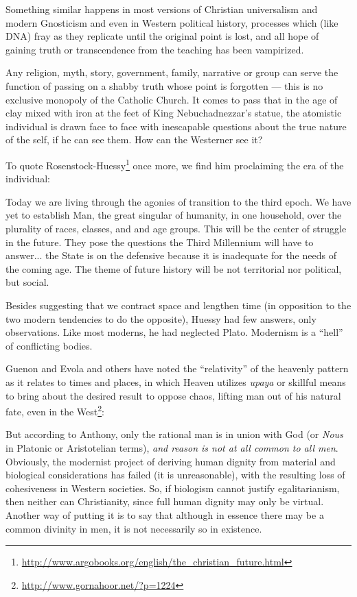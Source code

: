 Something similar happens in most versions of Christian universalism and modern Gnosticism and even in Western political history, processes which (like DNA) fray as they replicate until the original point is lost, and all hope of gaining truth or transcendence from the teaching has been vampirized.

Any religion, myth, story, government, family, narrative or group can serve the function of passing on a shabby truth whose point is forgotten --- this is no exclusive monopoly of the Catholic Church. It comes to pass that in the age of clay mixed with iron at the feet of King Nebuchadnezzar's statue, the atomistic individual is drawn face to face with inescapable questions about the true nature of the self, if he can see them. How can the Westerner see it?

To quote Rosenstock-Huessy\footnote{\url{http://www.argobooks.org/english/the_christian_future.html}} once more, we find him proclaiming the era of the individual:

\begin{quotex}
Today we are living through the agonies of transition to the third epoch. We have yet to establish Man, the great singular of humanity, in one household, over the plurality of races, classes, and and age groups. This will be the center of struggle in the future. They pose the questions the Third Millennium will have to answer... the State is on the defensive because it is inadequate for the needs of the coming age. The theme of future history will be not territorial nor political, but social.
\end{quotex}


Besides suggesting that we contract space and lengthen time (in opposition to the two modern tendencies to do the opposite), Huessy had few answers, only observations. Like most moderns, he had neglected Plato. Modernism is a ``hell'' of conflicting bodies.

Guenon and Evola and others have noted the ``relativity'' of the heavenly pattern as it relates to times and places, in which Heaven utilizes \emph{upaya} or skillful means to bring about the desired result to oppose chaos, lifting man out of his natural fate, even in the West\footnote{\url{http://www.gornahoor.net/?p=1224}}:

\begin{quotex}
But according to Anthony, only the rational man is in union with God (or \emph{Nous} in Platonic or Aristotelian terms), \emph{and reason is not at all common to all men}. Obviously, the modernist project of deriving human dignity from material and biological considerations has failed (it is unreasonable), with the resulting loss of cohesiveness in Western societies. So, if biologism cannot justify egalitarianism, then neither can Christianity, since full human dignity may only be virtual. Another way of putting it is to say that although in essence there may be a common divinity in men, it is not necessarily so in existence.
\end{quotex}


